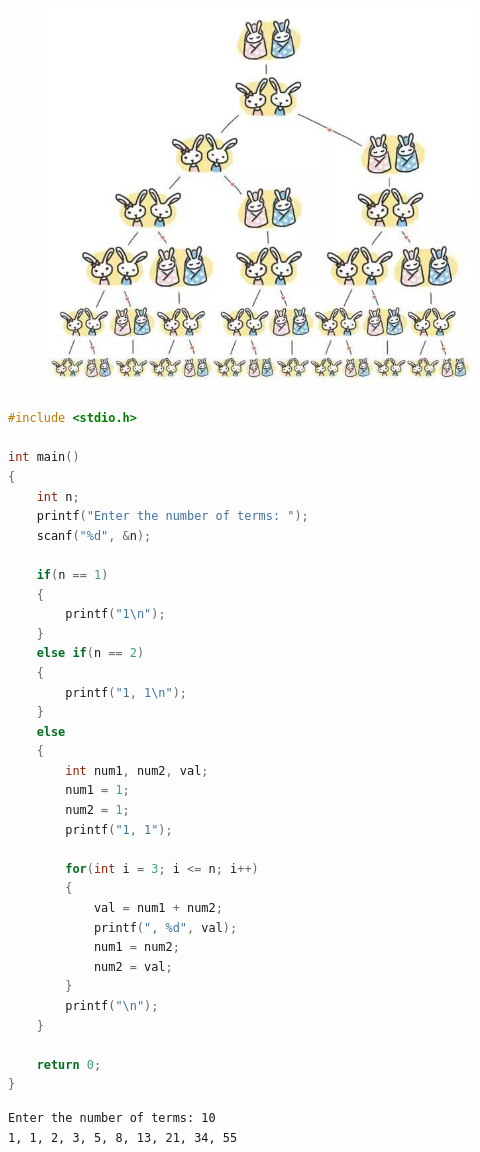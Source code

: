 \begin{figure}[H]
    \centering
    \includegraphics[scale=0.5]{img/Chapter3/3-2/1.png}
\end{figure}

\begin{lstlisting}[language=C]
#include <stdio.h>

int main()
{
    int n;
    printf("Enter the number of terms: ");
    scanf("%d", &n);

    if(n == 1)
    {
        printf("1\n");
    }
    else if(n == 2)
    {
        printf("1, 1\n");
    }
    else
    {
        int num1, num2, val;
        num1 = 1;
        num2 = 1;
        printf("1, 1");

        for(int i = 3; i <= n; i++)
        {
            val = num1 + num2;
            printf(", %d", val);
            num1 = num2;
            num2 = val;
        }
        printf("\n");
    }
    
    return 0;
}
\end{lstlisting}

\begin{tcolorbox}
    \begin{verbatim}
Enter the number of terms: 10
1, 1, 2, 3, 5, 8, 13, 21, 34, 55
\end{verbatim}
\end{tcolorbox}

\vspace{0.5cm}

